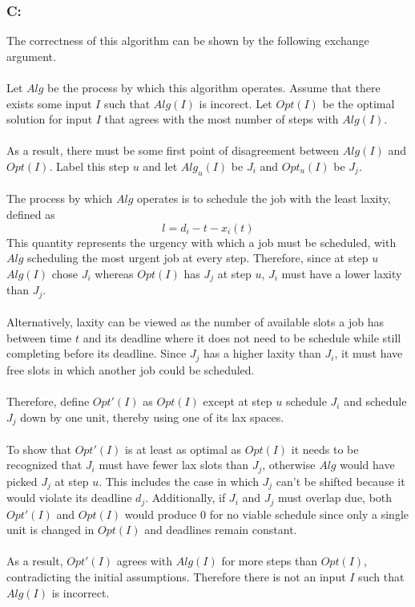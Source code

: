 \documentclass[12pt]{article}
\begin{document}
\subsubsection*{C:}
The correctness of this algorithm can be shown by the following exchange argument.\\\\ 
Let $Alg$ be the process by which this algorithm operates.
Assume that there exists some input $I$ such that $Alg(I)$ is incorect.  Let $Opt(I)$
be the optimal solution for input $I$ that agrees with the most number of steps with
$Alg(I)$.\\\\
As a result, there must be some first point of disagreement between $Alg(I)$ and $Opt(I)$.
Label this step $u$ and let $Alg_u(I)$ be $J_i$ and $Opt_u(I)$ be $J_j$.\\\\
The process by which $Alg$ operates is to schedule the job with the least laxity, defined as
\[
l = d_i - t - x_i(t)
\]   
This quantity represents the urgency with which a job must be scheduled, with $Alg$ scheduling
the most urgent job at every step.  Therefore, since at step $u$ $Alg(I)$ chose $J_i$ whereas
$Opt(I)$ has $J_j$ at step $u$, $J_i$ must have a lower laxity than $J_j$.\\\\
Alternatively, laxity can be viewed as the number of available slots a job has between time $t$
and its deadline where it does not need to be schedule while still completing before its deadline.  Since $J_j$ has a higher laxity than $J_i$, it must have free slots in which
another job could be scheduled.\\\\
Therefore, define $Opt'(I)$ as $Opt(I)$ except at step $u$ schedule $J_i$ and schedule $J_j$ down
by one unit, thereby using one of its lax spaces.\\\\
To show
that $Opt'(I)$ is at least as optimal as $Opt(I)$ it needs to be recognized that $J_i$ must have
fewer lax slots than $J_j$, otherwise $Alg$ would have picked $J_j$ at step $u$.  This includes
the case in which $J_j$ can't be shifted because it would violate its deadline $d_j$.  Additionally,
if $J_i$ and $J_j$ must overlap due, both $Opt'(I)$ and $Opt(I)$ would produce $0$ for no viable
schedule since only a single unit is changed in $Opt(I)$ and deadlines remain constant.\\\\
As a result,
$Opt'(I)$ agrees with $Alg(I)$ for more steps than $Opt(I)$, contradicting the initial assumptions. 
Therefore there is not an input $I$ such that $Alg(I)$ is incorrect.  
\end{document}

